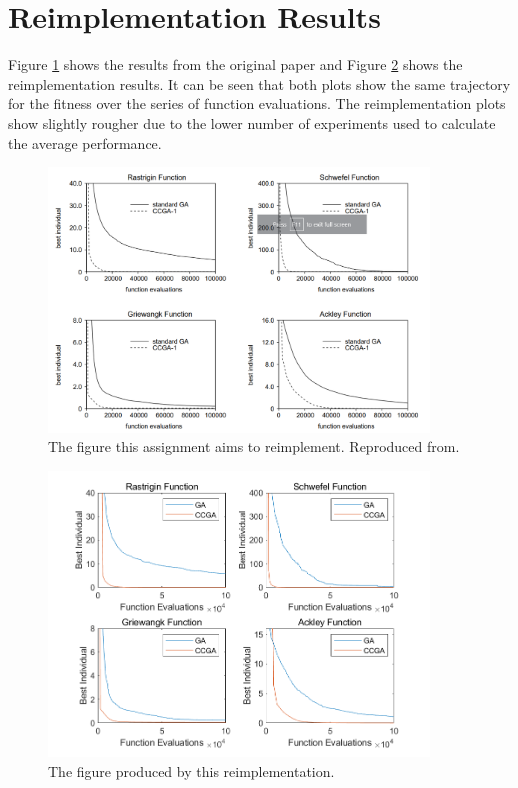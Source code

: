 \section{Reimplementation Results} \label{sec:reimplementation-results}

Figure \ref{fig:original_plot} shows the results from the original paper and Figure \ref{fig:combined_plot} shows the reimplementation results.
It can be seen that both plots show the same trajectory for the fitness over the series of function evaluations.
The reimplementation plots show slightly rougher due to the lower number of experiments used to calculate the average performance. 

\begin{figure}[ht!]
    \centering 
    \includegraphics[width=0.9\textwidth]{img/original_plot.png}
    \caption{The figure this assignment aims to reimplement. Reproduced from\cite{original-paper}.}
    \label{fig:original_plot}
  \end{figure}

\begin{figure}[ht!]
    \centering 
    \includegraphics[width=0.9\textwidth]{img/combined_plot.png}
    \caption{The figure produced by this reimplementation.}
    \label{fig:combined_plot}
\end{figure}

